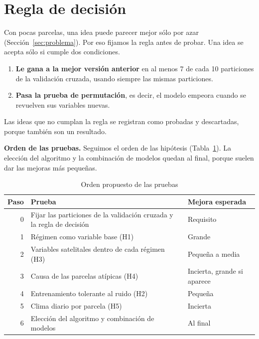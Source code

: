 \section{Regla de decisión}\label{sec:decision}
Con pocas parcelas, una idea puede parecer mejor sólo por azar (Sección~\ref{sec:problema}). Por eso fijamos la
regla antes de probar. Una idea se acepta sólo si cumple dos condiciones.
\begin{enumerate}
  \item \textbf{Le gana a la mejor versión anterior} en al menos 7 de cada 10 particiones de la validación cruzada,
        usando siempre las mismas particiones.
  \item \textbf{Pasa la prueba de permutación}, es decir, el modelo empeora cuando se revuelven sus variables nuevas.
\end{enumerate}
Las ideas que no cumplan la regla se registran como probadas y descartadas, porque también son un resultado.

\textbf{Orden de las pruebas.} Seguimos el orden de las hipótesis (Tabla~\ref{tab:orden}). La elección del algoritmo
y la combinación de modelos quedan al final, porque suelen dar las mejoras más pequeñas.

\begin{table}[!t]
\caption{Orden propuesto de las pruebas}\label{tab:orden}
\centering\footnotesize
\begin{tabularx}{\columnwidth}{@{}rX>{\raggedright\arraybackslash}p{2.1cm}@{}}
\toprule
Paso & Prueba & Mejora esperada \\
\midrule
0 & Fijar las particiones de la validación cruzada y la regla de decisión & Requisito \\
1 & Régimen como variable base (H1) & Grande \\
2 & Variables satelitales dentro de cada régimen (H3) & Pequeña a media \\
3 & Causa de las parcelas atípicas (H4) & Incierta, grande si aparece \\
4 & Entrenamiento tolerante al ruido (H2) & Pequeña \\
5 & Clima diario por parcela (H5) & Incierta \\
6 & Elección del algoritmo y combinación de modelos & Al final \\
\bottomrule
\end{tabularx}
\end{table}
